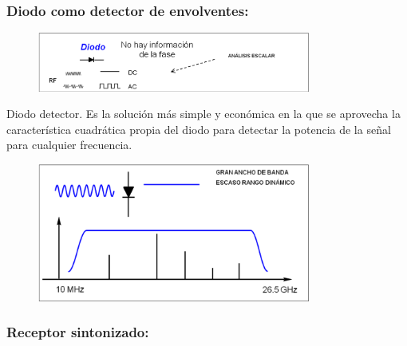 \documentclass[a4paper,12pt,twoside]{article}
\begin{document}
\subsubsection{Diodo como detector de envolventes:}
\begin{figure}[H]
    \centering
    \includegraphics[width=0.8\textwidth]{../img/diodo2.png}
\end{figure}

Diodo detector. Es la solución más simple y económica en la que se
aprovecha la característica cuadrática propia del diodo para detectar la
potencia de la señal para cualquier frecuencia.

\begin{figure}[H]
    \centering
    \includegraphics[width=0.8\textwidth]{../img/diodo.png}
\end{figure}


\subsubsection{Receptor sintonizado:}
\end{document}
